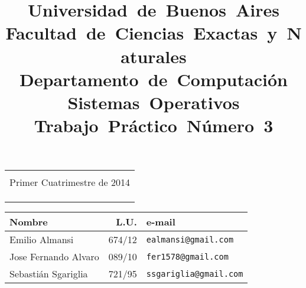 \title{
	\mbox{\Huge Universidad de Buenos Aires}\\
	\mbox{\LARGE Facultad de Ciencias Exactas y Naturales}\\
	\mbox{\LARGE Departamento de Computación}\\
	\mbox{\LARGE Sistemas Operativos}\\
	\mbox{Trabajo Práctico Número 3}\\
}

\date{}

\maketitle

\thispagestyle{empty}

\begin{center}
	\begin{tabular}{c}
		\hline
		\\
		Primer Cuatrimestre de 2014\\
		\\
		\hline
		\\
		\\
	\end{tabular}

	\begin{tabular}{|l|r|l|}
		\hline
		\textbf{Nombre} & \textbf{L.U.} & \textbf{e-mail}\\
		\hline
		Emilio Almansi & 674/12 & \verb"ealmansi@gmail.com"\\
		\hline
		Jose Fernando Alvaro & 089/10 & \verb"fer1578@gmail.com"\\
		\hline
		Sebastián Sgariglia & 721/95 & \verb"ssgariglia@gmail.com"\\
		\hline
	\end{tabular}
\end{center}

\vskip 5mm


